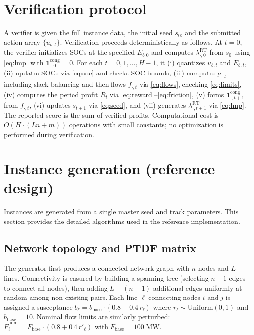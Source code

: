 \documentclass[11pt]{article}
\begin{document}
\section{Verification protocol}
A verifier is given the full instance data, the initial seed $s_0$, and the submitted action array $\{u_{b,t}\}$. Verification proceeds deterministically as follows. At $t=0$, the verifier initializes SOCs at the specified $E_{b,0}$ and computes $\lambda^{\mathrm{RT}}_{\cdot,0}$ from $s_0$ using \eqref{eq:lmp} with $\mathbf{1}^{\mathrm{cong}}_{\cdot,0}=0$. For each $t=0,1,\dots,H-1$, it (i) quantizes $u_{b,t}$ and $E_{b,t}$, (ii) updates SOCs via \eqref{eq:soc} and checks SOC bounds, (iii) computes $p_{\cdot,t}$ including slack balancing and then flows $f_{\cdot,t}$ via \eqref{eq:flows}, checking \eqref{eq:limits}, (iv) computes the period profit $R_t$ via \eqref{eq:reward}--\eqref{eq:friction}, (v) forms $\mathbf{1}^{\mathrm{cong}}_{\cdot,t+1}$ from $f_{\cdot,t}$, (vi) updates $s_{t+1}$ via \eqref{eq:seed}, and (vii) generates $\lambda^{\mathrm{RT}}_{\cdot,t+1}$ via \eqref{eq:lmp}. The reported score is the sum of verified profits. Computational cost is $O\!\left(H\cdot(Ln+m)\right)$ operations with small constants; no optimization is performed during verification.

\section{Instance generation (reference design)}
Instances are generated from a single master seed and track parameters. This section provides the detailed algorithms used in the reference implementation.

\subsection{Network topology and PTDF matrix}
The generator first produces a connected network graph with $n$ nodes and $L$ lines. Connectivity is ensured by building a spanning tree (selecting $n-1$ edges to connect all nodes), then adding $L-(n-1)$ additional edges uniformly at random among non-existing pairs. Each line $\ell$ connecting nodes $i$ and $j$ is assigned a susceptance $b_\ell = b_{\mathrm{base}}\cdot(0.8 + 0.4\,r_\ell)$ where $r_\ell\sim\mathrm{Uniform}(0,1)$ and $b_{\mathrm{base}}=10$. Nominal flow limits are similarly perturbed: $\overline{F}^{\mathrm{nom}}_\ell = \overline{F}_{\mathrm{base}}\cdot(0.8+0.4\,r'_\ell)$ with $\overline{F}_{\mathrm{base}}=100$ MW.
\end{document}
